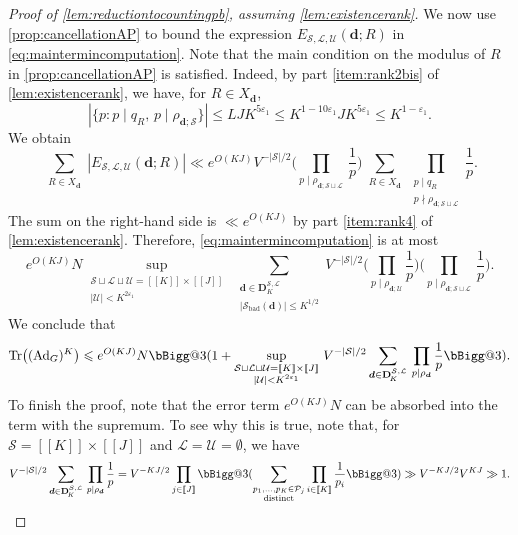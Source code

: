 \documentclass[11pt]{amsart}
\makeatletter
\theoremstyle{definition}
\renewcommand{\leq}{\leqslant}
\newcommand{\sinterval}[1]{[\![#1]\!] }
\newcommand{\abs}[1]{\left|#1\right|}
\newcommand{\eps}{\varepsilon}
\newcommand{\Ad}{\mathrm{Ad}}
\newcommand{\Tr}{\mathrm{Tr}}
\newcommand{\primes}{\mathcal{P}}
\renewcommand{\d}{\boldsymbol{d}}
\newcommand{\cstH}{\eps_1}
\newcommand{\cstU}{2\eps_1}
\newcommand{\quantity}{\repK^{1-\cstH}}
\newcommand{\rankcutoff}{\repK^{5\cstH}}
\newcommand{\boundelln}{\repK^{1-10\cstH}}
\newcommand{\curlyL}{V}
\newcommand{\graph}{G}
\newcommand{\fprod}[1]{\rho_{#1}}
\newcommand{\pall}{\fprod{\d}}
\newcommand{\lit}{\mathcal{L}}
\newcommand{\unlit}{\mathcal{U}}
\newcommand{\s}{\mathcal{S}}
\newcommand{\fancyD}{\mathbf{D}}
\newcommand{\Dss}{\fancyD^{\s,\lit}_{\!\repK}}
\newcommand{\elln}{L}
\newcommand{\modulus}{q}
\newcommand{\Xd}{X_{\d}}
\newcommand{\repR}{J}
\newcommand{\repK}{K}
\newcommand{\newK}{\sinterval{K}}
\newcommand{\newR}{\sinterval{J}}
\newcommand{\kbad}{\s_{\mathrm{bad}}(\d)}
\newcommand{\newerKR}{\newK\times\newR}
\newcommand{\vast}{\bBigg@{3}}
\makeatother
\begin{document}
\begin{proof}[Proof of \cref{lem:reductiontocountingpb}, assuming \cref{lem:existencerank}]
We now use \cref{prop:cancellationAP} to bound the expression $E_{\s,\lit,\unlit}(\d; R)$ in \cref{eq:maintermincomputation}. Note that the main condition on the modulus of $R$ in \cref{prop:cancellationAP} is satisfied. Indeed, by part \cref{item:rank2bis} of \cref{lem:existencerank}, we have, for $R\in \Xd$, %
\begin{equation*}
\abs{ \{p: p\mid \modulus_{R},\, p\mid \fprod{\d; \s}\}}\leq \elln \repR \rankcutoff \leq \boundelln J \rankcutoff \leq \quantity.
\end{equation*}
We obtain
\begin{equation*}
\sum_{\substack{R\in \Xd}} \abs{E_{\s,\lit,\unlit}(\d; R)}
\ll e^{O(\repK \repR)} \curlyL^{-|\s|/2}  \Bigg(\prod_{p\mid \fprod{\d; \s \sqcup \lit}}\, \frac{1}{p} \Bigg)  \sum_{\substack{R\in \Xd}}  \prod_{\substack{p\mid \modulus_{R}\\ p\nmid \fprod{\d; \s \sqcup \lit}}}\frac{1}{p}.
\end{equation*}
The sum on the right-hand side is $\ll e^{O(\repK \repR)}$ by part \cref{item:rank4} of \cref{lem:existencerank}. Therefore, \cref{eq:maintermincomputation} is at most
\begin{equation*}
e^{O(\repK \repR)} N \sup_{\substack{\s\sqcup \lit\sqcup \unlit = \newerKR\\ |\unlit| <\repK^{\cstU}}}\, \sum_{\substack{\d\in \Dss \\ |{\kbad}| \leq\repK^{1/2}}}\!\! \curlyL^{-|\s|/2} \Bigg(\prod_{p\mid \fprod{\d; \unlit}} \frac{1}{p}\Bigg)  \Bigg(\prod_{p\mid \fprod{\d; \s \sqcup \lit}}\, \frac{1}{p} \Bigg).
\end{equation*}
We conclude that 
\begin{equation*}
\Tr \big((\Ad_{\graph})^{\repK}\big) \leq e^{O(\repK \repR)} N \vast(1 + \sup_{\substack{\s\sqcup \lit\sqcup \unlit = \newerKR\\ |\unlit| <\repK^{\cstU}}}\,\curlyL^{-|\s|/2}  \sum_{\substack{\d\in \Dss}}\,\prod_{p\mid \pall} \frac{1}{p} \vast).
\end{equation*}
To finish the proof, note that the error term $e^{O(\repK \repR)} N$ can be absorbed into the term with the supremum. To see why this is true, note that, for $\s = \newerKR$ and $\lit=\unlit=\emptyset$, we have
\begin{equation*}
\curlyL^{-|\s|/2}  \sum_{\substack{\d\in \Dss}}\,\prod_{p\mid \pall} \frac{1}{p} = \curlyL^{-\repK\repR/2} \prod_{j\in \newR}\vast( \sum_{\substack{p_1, \ldots, p_{\repK}\in \primes_j \\ \text{distinct}}} \prod_{i\in \newK} \frac{1}{p_i} \vast)  \gg \curlyL^{-\repK\repR/2} \curlyL^{\repK\repR} \gg 1.\qedhere
\end{equation*}
\end{proof}
\end{document}
